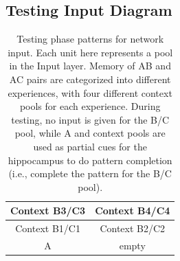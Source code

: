 \documentclass[11pt,twoside]{article}
\newif\myifpdf
\begin{document}
\FloatBarrier
\subsection{Testing Input Diagram}
\begin{table}[hbt!]
\begin{tabular}{|c|c|}
\hline
Context B3/C3 & Context B4/C4 \\
\hline
Context B1/C1 & Context B2/C2 \\
\hline
A & empty \\
\hline
\end{tabular}
\caption{Testing phase patterns for network input.  Each unit here represents a pool in the Input layer.  Memory of AB and AC pairs are categorized into different experiences, with four different context pools for each experience.  During testing, no input is given for the B/C pool, while A and context pools are used as partial cues for the hippocampus to do pattern completion (i.e., complete the pattern for the B/C pool).} 
\end{table}

% 

\end{document}
